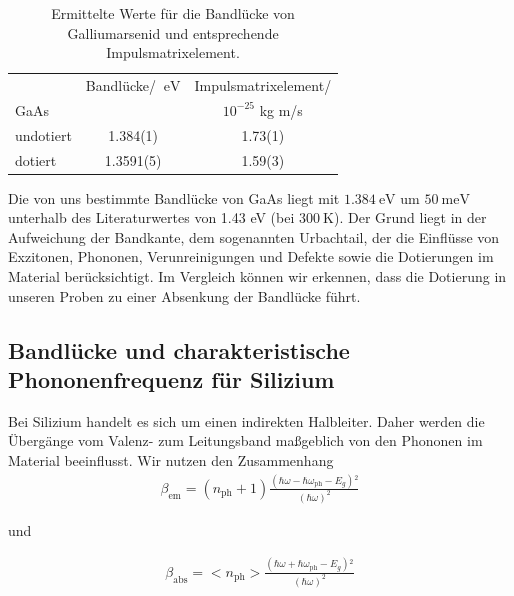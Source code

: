\documentclass[paper=a4,fontsize=10pt,DIV=18,twocolumn,parskip=half]{scrartcl}
\numberwithin{equation}{section}    %
\begin{document}
\begin{table}
    \begin{center}
\begin{tabular}[r]{ l | c c }
            &Bandlücke/ $\SI{}{\eV}	$		&Impulsmatrixelement/\\
  GaAs &  & $10^{-25}$ kg m/s\\
  \hline
  undotiert & 1.384(1) & 1.73(1) \\
 dotiert & 1.3591(5) & 1.59(3)   \end{tabular}
\caption{Ermittelte Werte für die Bandlücke von Galliumarsenid und entsprechende 
Impulsmatrixelement.}
  \label{ime}  \end{center}
\end{table}

Die von uns bestimmte Bandlücke von GaAs liegt mit $\SI{1.384}{\eV}$ um 
$\SI{50}{\milli\eV}$ unterhalb des Literaturwertes von 1.43 eV (bei 
$\SI{300}{\K}$). Der Grund liegt in der Aufweichung der Bandkante, dem 
sogenannten Urbachtail, der die Einflüsse von
Exzitonen, Phononen, Verunreinigungen und Defekte sowie die Dotierungen im 
Material berücksichtigt. Im Vergleich können wir erkennen, dass die Dotierung in 
unseren Proben zu einer Absenkung der Bandlücke führt.

\subsection{Bandlücke und charakteristische Phononenfrequenz für Silizium}

Bei Silizium handelt es sich um einen indirekten Halbleiter. Daher werden die 
Übergänge vom Valenz- zum Leitungsband maßgeblich von den Phononen im Material 
beeinflusst. Wir nutzen den Zusammenhang
\begin{align}
    \beta _{\text{em} }=\left(n_{\text{ph}}+1\right)\frac{\left(\hbar \omega 
    -\hbar \omega _{\text{ph}}-E_g\right){}^2}{(\hbar \omega )^2}
\end{align}

und 

\begin{align}
    \beta _{\text{abs} }=<n_{\text{ph}}>\frac{\left(\hbar \omega +\hbar \omega 
    _{\text{ph}}-E_g\right){}^2}{(\hbar \omega )^2}
\end{align}
\end{document}
